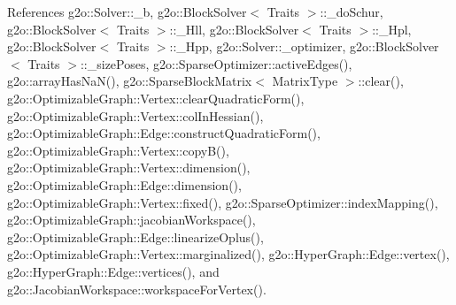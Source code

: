 References g2o\+::\+Solver\+::\+\_\+b, g2o\+::\+Block\+Solver$<$ Traits $>$\+::\+\_\+do\+Schur, g2o\+::\+Block\+Solver$<$ Traits $>$\+::\+\_\+\+Hll, g2o\+::\+Block\+Solver$<$ Traits $>$\+::\+\_\+\+Hpl, g2o\+::\+Block\+Solver$<$ Traits $>$\+::\+\_\+\+Hpp, g2o\+::\+Solver\+::\+\_\+optimizer, g2o\+::\+Block\+Solver$<$ Traits $>$\+::\+\_\+size\+Poses, g2o\+::\+Sparse\+Optimizer\+::active\+Edges(), g2o\+::array\+Has\+Na\+N(), g2o\+::\+Sparse\+Block\+Matrix$<$ Matrix\+Type $>$\+::clear(), g2o\+::\+Optimizable\+Graph\+::\+Vertex\+::clear\+Quadratic\+Form(), g2o\+::\+Optimizable\+Graph\+::\+Vertex\+::col\+In\+Hessian(), g2o\+::\+Optimizable\+Graph\+::\+Edge\+::construct\+Quadratic\+Form(), g2o\+::\+Optimizable\+Graph\+::\+Vertex\+::copy\+B(), g2o\+::\+Optimizable\+Graph\+::\+Vertex\+::dimension(), g2o\+::\+Optimizable\+Graph\+::\+Edge\+::dimension(), g2o\+::\+Optimizable\+Graph\+::\+Vertex\+::fixed(), g2o\+::\+Sparse\+Optimizer\+::index\+Mapping(), g2o\+::\+Optimizable\+Graph\+::jacobian\+Workspace(), g2o\+::\+Optimizable\+Graph\+::\+Edge\+::linearize\+Oplus(), g2o\+::\+Optimizable\+Graph\+::\+Vertex\+::marginalized(), g2o\+::\+Hyper\+Graph\+::\+Edge\+::vertex(), g2o\+::\+Hyper\+Graph\+::\+Edge\+::vertices(), and g2o\+::\+Jacobian\+Workspace\+::workspace\+For\+Vertex().


